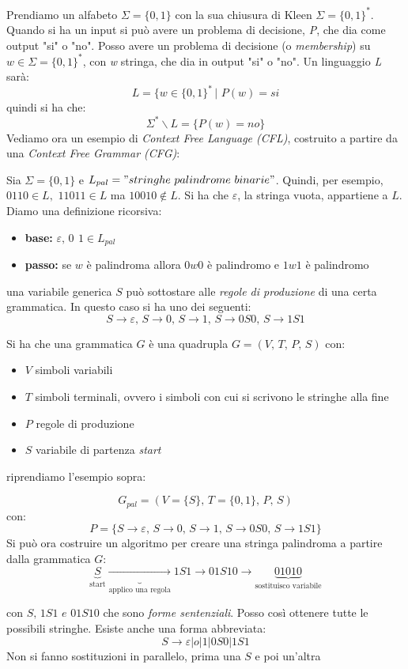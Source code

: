 Prendiamo un alfabeto $\Sigma=\{0, 1\}$ con la sua chiusura di Kleen $\Sigma=\{0, 1\}^*$. Quando si ha un input si può avere un problema di decisione, \textit{P}, che dia come output "si" o "no". Posso avere un problema di decisione (o \textit{membership}) su $w\in\Sigma=\{0, 1\}^*$, con \textit{w} stringa, che dia in output "si" o "no". Un linguaggio \textit{L} sarà:
$$L=\{w\in\{0, 1\}^*\,|\,\, P(w)=si$$
quindi si ha che:
$$\Sigma^*\backslash L=\{P(w)=no\}$$
Vediamo ora un esempio di \textit{Context Free Language (CFL)}, costruito a partire da una \textit{Context Free Grammar (CFG)}:
\begin{example}
	Sia $\Sigma=\{0, 1\}$ e $L_{pal}="stringhe\,\, palindrome\,\, binarie"$.
	Quindi, per esempio, $0110\in L,\,\, 11011\in L$ ma $10010\not\in L$. Si ha che $\varepsilon$, la stringa vuota, appartiene a $L$. Diamo una definizione ricorsiva:
	\begin{itemize}
		\item \textbf{base:} $\varepsilon,\, 0\,\ 1\in L_{pal}$
		\item \textbf{passo:} se $w$ è palindroma allora $0w0$ è palindromo e $1w1$ è palindromo
	\end{itemize}
	una variabile generica $S$ può sottostare alle \textit{regole di produzione} di una certa grammatica. In questo caso si ha uno dei seguenti:
	$$S\to\varepsilon,\, S\to 0,\, S\to 1,\, S\to 0S0,\, S\to 1S1$$
\end{example}
Si ha che una grammatica $G$ è una quadrupla $G=(V,\,T,\,P,\,S)$ con:
\begin{itemize}
	\item $V$ simboli variabili
	\item $T$ simboli terminali, ovvero i simboli con cui si scrivono le stringhe alla fine
	\item $P$ regole di produzione
	\item $S$ variabile di partenza \textit{start}
\end{itemize}
riprendiamo l'esempio sopra:
\begin{example}
	$$G_{pal}=(V=\{S\},\, T=\{0, 1\},\, P,\, S)$$
	con:
	$$P=\{S\to\varepsilon,\, S\to 0,\, S\to 1,\, S\to 0S0,\, S\to 1S1\}$$
	Si può ora costruire un algoritmo per creare una stringa palindroma a partire dalla grammatica $G$:
	$$\underbrace{S}_{\mbox{start}}\underbrace{\to}_{\mbox{applico una regola}} 1S1 \to 01S10\to \underbrace{01010}_{\mbox{sostituisco variabile}}$$

	con $S,\, 1S1\,\, e\,\, 01S10$ che sono \textit{forme sentenziali}. Posso così ottenere tutte le possibili stringhe. Esiste anche una forma abbreviata:
	$$S\to \varepsilon|o|1|0S0|1S1$$
	Non si fanno sostituzioni in parallelo, prima una $S$ e poi un'altra
\end{example}
